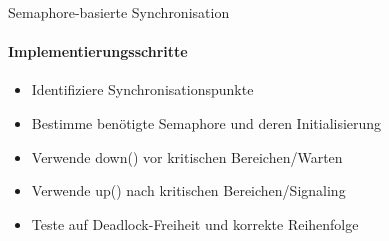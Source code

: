 \begin{KR}{Semaphore-basierte Synchronisation}
    \paragraph{Implementierungsschritte}
    \begin{itemize}
        \item Identifiziere Synchronisationspunkte
        \item Bestimme benötigte Semaphore und deren Initialisierung
        \item Verwende down() vor kritischen Bereichen/Warten
        \item Verwende up() nach kritischen Bereichen/Signaling
        \item Teste auf Deadlock-Freiheit und korrekte Reihenfolge
    \end{itemize}
\end{KR}

